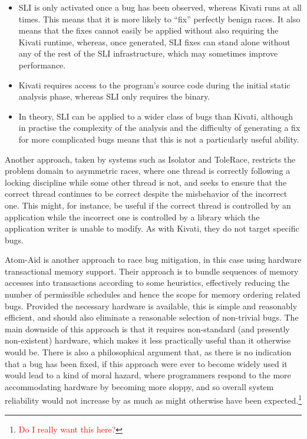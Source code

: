 \documentclass[10pt,twocolumn,preprint,natbib,authoryear]{sigplanconf}
\newcommand{\editorial}[1]{\textcolor{red}{\footnote{\textcolor{red}{#1}}}}
\begin{document}
\begin{itemize}
\item SLI is only activated once a bug has been observed, whereas
  Kivati runs at all times.  This means that it is more likely to
  ``fix'' perfectly benign races.  It also means that the fixes cannot
  easily be applied without also requiring the Kivati runtime,
  whereas, once generated, SLI fixes can stand alone without any of
  the rest of the SLI infrastructure, which may sometimes improve
  performance.

\item Kivati requires access to the program's source code during the
  initial static analysis phase, whereas SLI only requires the binary.

\item In theory, SLI can be applied to a wider class of bugs than
  Kivati, although in practise the complexity of the analysis and the
  difficulty of generating a fix for more complicated bugs means that
  this is not a particularly useful ability.
\end{itemize}

Another approach, taken by systems such as
Isolator\cite{Ramalingam2009} and ToleRace\cite{Kirovski2007},
restricts the problem domain to asymmetric races, where one thread is
correctly following a locking discipline while some other thread is
not, and seeks to ensure that the correct thread continues to be
correct despite the misbehavior of the incorrect one.  This might,
for instance, be useful if the correct thread is controlled by an
application while the incorrect one is controlled by a library which
the application writer is unable to modify.  As with Kivati, they do
not target specific bugs.

Atom-Aid\cite{Lucia2009} is another approach to race bug
mitigation, in this case using hardware transactional memory support.
Their approach is to bundle sequences of memory accesses into
transactions according to some heuristics, effectively reducing the
number of permissible schedules and hence the scope for memory
ordering related bugs.  Provided the necessary hardware is available,
this is simple and reasonably efficient, and should also eliminate a
reasonable selection of non-trivial bugs.  The main downside of this
approach is that it requires non-standard (and presently non-existent)
hardware, which makes it less practically useful than it otherwise
would be.  There is also a philosophical argument that, as there is no
indication that a bug has been fixed, if this approach were ever to
become widely used it would lead to a kind of moral hazard, where
programmers respond to the more accommodating hardware by becoming
more sloppy, and so overall system reliability would not increase by
as much as might otherwise have been expected.\editorial{Do I really
  want this here?}
\end{document}
